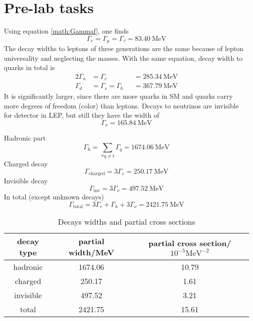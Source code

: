 \section{Pre-lab tasks}
Using equation \eqref{math:Gammaf}, one finds
\begin{equation}
	\Gamma_e = \Gamma_\mu = \Gamma_\tau = \SI{83.40}{\mega\eV}
\end{equation}
The decay widths to leptons of three generations are the same because of lepton universality and neglecting the masses. With the same equation, decay width to quarks in total is
\begin{alignat*}{2}
	\Gamma_u &= \Gamma_c &&= \SI{285.34}{\mega\eV} \\
	\Gamma_d &= \Gamma_s = \Gamma_b &&= \SI{367.79}{\mega\eV}
\end{alignat*}
It is significantly larger, since there are more quarks in SM and quarks carry more degrees of freedom (color) than leptons. Decays to neutrinos are invisible for detector in LEP, but still they have the width of
\begin{equation}
	\Gamma_{\nu} = \SI{165.84}{\mega\eV}
\end{equation}

Hadronic part
\begin{equation}
	\Gamma_\text{h} = \sum_{\forall q\neq t} \Gamma_q = \SI{1674.06}{\mega\eV}
\end{equation}
Charged decay
\begin{equation}
	\Gamma_\text{charged} = 3 \Gamma_e = \SI{250.17}{\mega\eV}
\end{equation}
Invisible decay
\begin{equation}
	\Gamma_\text{inv} = 3\Gamma_\nu = \SI{497.52}{\mega\eV}
\end{equation}
In total (except unknown decays)
\begin{equation}
	\Gamma_\text{total} = 3\Gamma_e + \Gamma_h + 3\Gamma_\nu = \SI{2421.75}{\mega\eV}
\end{equation}

\begin{table}[ht]
	\centering
	\label{tab:label}
	\begin{tabular}{ccc}
		\toprule
		decay type & partial width/\si{\mega\eV} & partial cross section/$10^{-5}\si{\mega\eV\tothe{-2}}$	 \\
		\midrule
		hadronic & \num{1674.06} & \num{10.79} \\
		charged & \num{250.17} & \num{1.61} \\
		invisible & \num{497.52} & \num{3.21}  \\
		total & \num{2421.75} & \num{15.61} \\
		\bottomrule
	\end{tabular}
	\caption{Decays widths and partial cross sections}
\end{table}


